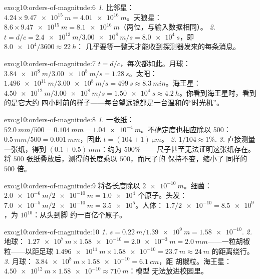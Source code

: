 \begin{solution}{exo:g10:orders-of-magnitude:6}
\emph{1.} 比邻星：
$4.24 \times \qty{9.47e15}{m} = \qty{4.01e16}{m}$。天狼星：
$8.6 \times \qty{9.47e15}{m} = \qty{8.1e16}{m}$（两位，与输入数据相同）。
\emph{2.} $t = d/c = \qty{2.4e13}{m} / \qty{3.00e8}{m/s}
= \qty{8.0e4}{s}$，即 $\num{8.0e4}/3600 \approx \qty{22}{h}$：
几乎要等一整天才能收到探测器发来的每条消息。
\end{solution}

\begin{solution}{exo:g10:orders-of-magnitude:7}
$t = d/c$，每次都如此。月球：
$\qty{3.84e8}{m}/\qty{3.00e8}{m/s} = \qty{1.28}{s}$。太阳：
$\qty{1.496e11}{m}/\qty{3.00e8}{m/s} = \qty{499}{s} \approx
\qty{8.3}{min}$。海王星：
$\qty{4.50e12}{m}/\qty{3.00e8}{m/s} = \qty{1.50e4}{s} \approx
\qty{4.2}{h}$。你看到海王星时，看到的是它大约
四小时前的样子——每台望远镜都是一台温和的“时光机”。
\end{solution}

\begin{solution}{exo:g10:orders-of-magnitude:8}
\emph{1.} 一张纸：$\qty{52.0}{mm}/500 = \qty{0.104}{mm}
= \qty{1.04e-4}{m}$。不确定度也相应除以 500：
$\qty{0.5}{mm}/500 = \qty{0.001}{mm}$，因此
$t = (104 \pm 1)\,\unit{\micro m}$。
\emph{2.} $1/104 \approx 1\%$.
\emph{3.} 直接测量一张纸，得到
$(0.1 \pm 0.5)\,\unit{mm}$：约为 $500\%$
——尺子甚至无法证明这张纸存在。将 $500$
张纸叠放后，测得的长度乘以 $500$，而尺子的
保持不变，缩小了
同样的 $500$ 倍。
\end{solution}

\begin{solution}{exo:g10:orders-of-magnitude:9}
将各长度除以 $\qty{2e-10}{m}$。细菌：
$\qty{2.0e-6}{m}/\qty{2e-10}{m} = \num{1.0e4}$ 个原子。头发：
$\qty{7.0e-5}{m}/\qty{2e-10}{m} = \num{3.5e5}$。人体：
$1.7/\num{2e-10} = \num{8.5e9}$，为 $10^{10}$：从头到脚
约一百亿个原子。
\end{solution}

\begin{solution}{exo:g10:orders-of-magnitude:10}
\emph{1.} $s = \qty{0.22}{m}/\qty{1.39e9}{m} = \num{1.58e-10}$.
\emph{2.} 地球：
$\qty{1.27e7}{m} \times \num{1.58e-10} = \qty{2.0e-3}{m} =
\qty{2.0}{mm}$——一粒胡椒粒——以距足球
$\qty{1.496e11}{m} \times \num{1.58e-10} = \qty{23.7}{m} \approx
\qty{24}{m}$ 的距离绕行。
\emph{3.} 月球：
$\qty{3.84e8}{m} \times \num{1.58e-10} = \qty{6.1}{cm}$，距
胡椒粒。海王星：
$\qty{4.50e12}{m} \times \num{1.58e-10} \approx \qty{710}{m}$：模型
无法放进校园里。
\end{solution}

